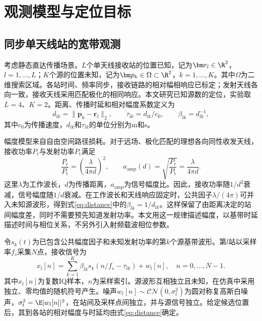 \section{观测模型与定位目标}\label{sec:model}
\subsection{同步单天线站的宽带观测}
考虑静态直达传播场景。$L$个单天线接收站的位置已知，记为$\bm r_l\in\R^2$，$l=1,\ldots,L$；$K$个源的位置未知，记为$\bm p_k\in\Omega\subset\R^2$，$k=1,\ldots,K$。其中$\Omega$为二维搜索区域。各站时间、频率同步，接收链路的相对幅相响应已标定；发射天线各向一致，接收天线采用匹配极化的相同响应。本文研究已知源数的定位，实验取$L=4$、$K=2$。距离、传播时延和相对幅度系数定义为
\begin{equation}
 d_{lk}=\|\bm p_k-\bm r_l\|_2,\qquad
 \tau_{lk}=d_{lk}/c_0,\qquad \beta_{lk}=d_{lk}^{-1},
 \label{eq:distance}
\end{equation}
其中$c_0$为传播速度，$d_{lk}$和$\tau_{lk}$的单位分别为m和s。

幅度模型来自自由空间路径损耗。对于远场、极化匹配的理想各向同性收发天线，接收功率$P_{\mathrm r}$与发射功率$P_{\mathrm t}$满足\cite{ITURP5252024}
\begin{equation}
 \frac{P_{\mathrm r}}{P_{\mathrm t}}
 =\left(\frac{\lambda}{4\pi d}\right)^2,\qquad
 a_{\mathrm{amp}}(d)=\sqrt{\frac{P_{\mathrm r}}{P_{\mathrm t}}}
 =\frac{\lambda}{4\pi d} .\label{eq:freespace}
\end{equation}
这里$\lambda$为工作波长，$d$为传播距离，$a_{\mathrm{amp}}$为信号幅度比。因此，接收功率随$1/d^2$衰减，信号幅度随$1/d$衰减。在工作波长和天线响应固定时，公共因子$\lambda/(4\pi)$可并入未知源波形，得到式\eqref{eq:distance}中的$\beta_{lk}=1/d_{lk}$。这样保留了由距离决定的站间幅度差，同时不需要预先知道发射功率。本文用这一规律描述幅度，以基带时延描述时间与相位关系，不另外引入射频载波相位参数。

令$s_k(t)$为已包含公共幅度因子和未知发射功率的第$k$个源基带波形。第$l$站以采样率$f_s$采集$N$点，接收信号为
\begin{equation}
 x_l[n]=\sum_{k=1}^{K}\beta_{lk}s_k(n/f_s-\tau_{lk})+w_l[n],
 \quad n=0,\ldots,N-1 .\label{eq:time}
\end{equation}
其中$x_l[n]$为复数IQ样本，$n$为采样索引。源波形互相独立且未知，在仿真中采用独立、零均值的随机符号产生。噪声$w_l[n]\sim\mathcal{CN}(0,\sigma_t^2)$为圆对称复高斯白噪声，$\sigma_t^2=\E|w_l[n]|^2$，在站间及采样点间独立，并与源信号独立。给定候选位置后，其到各站的相对幅度与时延均由式\eqref{eq:distance}确定。

